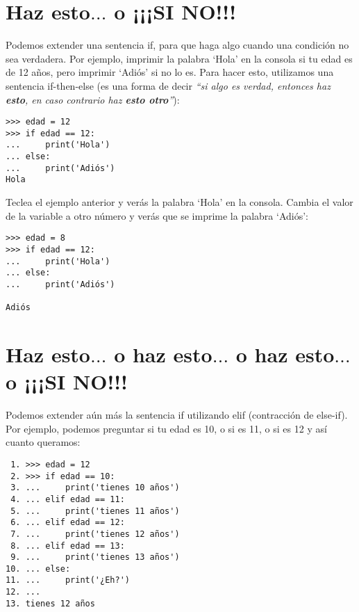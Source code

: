 \section{Haz esto$\ldots$ o ¡¡¡SI NO!!!}

Podemos extender una sentencia if, para que haga algo cuando una condición no sea verdadera.  Por ejemplo, imprimir la palabra `Hola' en la consola si tu edad es de 12 años, pero imprimir `Adiós' si no lo es.  Para hacer esto, utilizamos una sentencia if-then-else (es una forma de decir \emph{``si algo es verdad, entonces haz \textbf{esto}, en caso contrario haz \textbf{esto otro}''}):

\begin{listing}
\begin{verbatim}
>>> edad = 12
>>> if edad == 12:
...     print('Hola')
... else:
...     print('Adiós')
Hola
\end{verbatim}
\end{listing}

Teclea el ejemplo anterior y verás la palabra `Hola' en la consola.  Cambia el valor de la variable  a otro número y verás que se imprime la palabra `Adiós':

\begin{listing}
\begin{verbatim}
>>> edad = 8
>>> if edad == 12:
...     print('Hola')
... else:
...     print('Adiós')

Adiós
\end{verbatim}
\end{listing}

\section{Haz esto$\ldots$ o haz esto$\ldots$ o haz esto$\ldots$ o ¡¡¡SI NO!!!}

Podemos extender aún más la sentencia if utilizando elif (contracción de else-if).  Por ejemplo, podemos preguntar si tu edad es 10, o si es 11, o si es 12 y así cuanto queramos: 

\begin{listing}
\begin{verbatim}
 1. >>> edad = 12
 2. >>> if edad == 10:
 3. ...     print('tienes 10 años')
 4. ... elif edad == 11:
 5. ...     print('tienes 11 años')
 6. ... elif edad == 12:
 7. ...     print('tienes 12 años')
 8. ... elif edad == 13:
 9. ...     print('tienes 13 años')
10. ... else:
11. ...     print('¿Eh?')
12. ...
13. tienes 12 años
\end{verbatim}
\end{listing}

